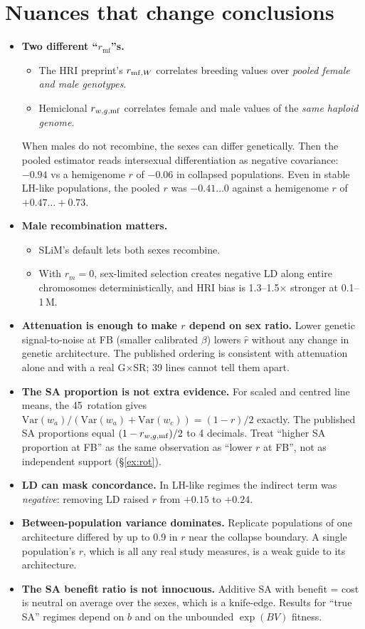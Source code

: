 \section{Nuances that change conclusions}
\begin{itemize}
\item \textbf{Two different ``$r_\mathrm{mf}$''s.}
  \begin{itemize}
  \item The HRI preprint's $r_{\mathrm{mf},W}$ correlates breeding values over \emph{pooled female and male genotypes}.
  \item Hemiclonal $r_{w,g,\mathrm{mf}}$ correlates female and male values of the \emph{same haploid genome}.
  \end{itemize}
  When males do not recombine, the sexes can differ genetically. Then the pooled estimator reads intersexual differentiation as negative covariance: $-0.94$ vs a hemigenome $r$ of $-0.06$ in collapsed populations. Even in stable LH-like populations, the pooled $r$ was $-0.41\ldots0$ against a hemigenome $r$ of $+0.47\ldots+0.73$.
\item \textbf{Male recombination matters.}
  \begin{itemize}
  \item SLiM's default lets both sexes recombine.
  \item With $r_m=0$, sex-limited selection creates negative LD along entire chromosomes deterministically, and HRI bias is 1.3--1.5$\times$ stronger at 0.1--1\,M.
  \end{itemize}
\item \textbf{Attenuation is enough to make $r$ depend on sex ratio.} Lower genetic signal-to-noise at FB (smaller calibrated $\beta$) lowers $\hat r$ without any change in genetic architecture. The published ordering is consistent with attenuation alone and with a real G$\times$SR; 39 lines cannot tell them apart.
\item \textbf{The SA proportion is not extra evidence.} For scaled and centred line means, the 45\textdegree\ rotation gives $\mathrm{Var}(w_a)/(\mathrm{Var}(w_a)+\mathrm{Var}(w_c))=(1-r)/2$ exactly. The published SA proportions equal $(1-r_{w,g,\mathrm{mf}})/2$ to 4 decimals. Treat ``higher SA proportion at FB'' as the same observation as ``lower $r$ at FB'', not as independent support (\S\ref{ex:rot}).
\item \textbf{LD can mask concordance.} In LH-like regimes the indirect term was \emph{negative}: removing LD raised $r$ from $+0.15$ to $+0.24$.
\item \textbf{Between-population variance dominates.} Replicate populations of one architecture differed by up to 0.9 in $r$ near the collapse boundary. A single population's $r$, which is all any real study measures, is a weak guide to its architecture.
\item \textbf{The SA benefit ratio is not innocuous.} Additive SA with benefit = cost is neutral on average over the sexes, which is a knife-edge. Results for ``true SA'' regimes depend on $b$ and on the unbounded $\exp(BV)$ fitness.
\end{itemize}

